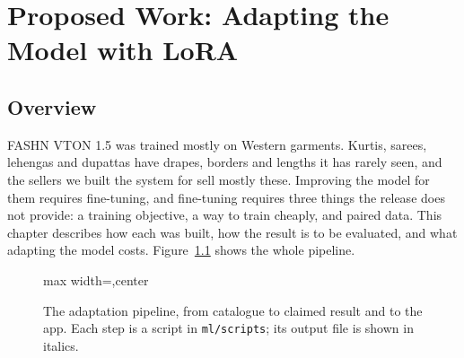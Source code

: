 \chapter{Proposed Work: Adapting the Model with LoRA}

\section{Overview}

FASHN VTON 1.5 was trained mostly on Western garments. Kurtis, sarees, lehengas and dupattas have drapes, borders and lengths it has rarely seen, and the sellers we built the system for sell mostly these. Improving the model for them requires fine-tuning, and fine-tuning requires three things the release does not provide: a training objective, a way to train cheaply, and paired data. This chapter describes how each was built, how the result is to be evaluated, and what adapting the model costs. Figure~\ref{fig:lorapipe} shows the whole pipeline.

\begin{figure}[!htbp]
\centering
\begin{adjustbox}{max width=\linewidth,center}
\end{adjustbox}
\caption{The adaptation pipeline, from catalogue to claimed result and to the app. Each step is a script in \texttt{ml/scripts}; its output file is shown in italics.}
\label{fig:lorapipe}
\end{figure}

